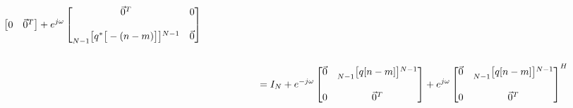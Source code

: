 \documentclass{article}
\begin{document}
\begin{align*}
\begin{bmatrix}
                                                                         0  & \vec{0}^{T}
                                                                \end{bmatrix}
                                                + e^{ j\omega}\begin{bmatrix}
                                                                                                                                          \vec{0}^{T} &      0 \\ \\
                                                                    \prescript{}{N - 1}{\begin{bmatrix} q^{*}\big[-(n - m)\big]\end{bmatrix}}^{N - 1} & \vec{0}
                                                                \end{bmatrix} \\ \\
    & \quad \quad \quad \quad \quad \ \ = I_{N} + e^{-j\omega}\begin{bmatrix}
                                                                    \vec{0} & \prescript{}{N - 1}{\begin{bmatrix} q[n - m] \end{bmatrix}}^{N - 1} \\ \\
                                                                         0  & \vec{0}^{T}
                                                                \end{bmatrix}
                                                + e^{ j\omega}\begin{bmatrix}
                                                                    \vec{0} & \prescript{}{N - 1}{\begin{bmatrix} q[n - m]\end{bmatrix}}^{N - 1} \\ \\
                                                                         0  & \vec{0}^{T}
                                                                \end{bmatrix}^{H}
  \end{align*}\newpage
\end{document}

